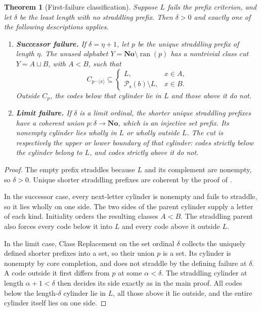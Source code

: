 \documentclass[11pt]{article}
\newtheorem{theorem}{Theorem}[section]
\theoremstyle{definition}
\theoremstyle{remark}
\newcommand{\No}{\mathbf{No}}
\newcommand{\Psupp}{\mathcal P_{\mathrm{s}}}
\begin{document}
\begin{theorem}[First-failure classification]
\label{swo:sh:thm:cut-first-failure}
Suppose $L$ fails the prefix criterion, and let $\delta$ be the
least length with no straddling prefix.  Then $\delta>0$ and
exactly one of the following descriptions applies.
\begin{enumerate}
\item \textbf{Successor failure.} If $\delta=\eta+1$, let $p$ be
the unique straddling prefix of length $\eta$.  The unused alphabet
$Y=\No\setminus\operatorname{ran}(p)$ has a nontrivial
class cut $Y=A\sqcup B$, with $A<B$, such that
\[
 C_{p\mathbin{{}^\frown}\langle x\rangle}
 \subseteq
 \begin{cases}
 L,&x\in A,\\
 \Psupp(b)\setminus L,&x\in B.
 \end{cases}
\]
Outside $C_{p}$, the codes below that cylinder lie in
$L$ and those above it do not.
\item \textbf{Limit failure.} If $\delta$ is a limit ordinal,
the shorter unique straddling prefixes have a coherent union
$p:\delta\to\No$, which is an injective \emph{set}
prefix.  Its nonempty cylinder lies wholly in $L$ or wholly outside
$L$.  The cut is respectively the upper or lower boundary of
that cylinder: codes strictly below the cylinder belong to $L$,
and codes strictly above it do not.
\end{enumerate}
\end{theorem}
\begin{proof}
The empty prefix straddles because $L$ and its complement are
nonempty, so $\delta>0$.  Unique shorter straddling prefixes are
coherent by the proof of .

In the successor case, every next-letter cylinder is nonempty
and fails to straddle, so it lies wholly on one side.  The two
sides of the parent cylinder supply a letter of each kind.
Initiality orders the resulting classes $A<B$.  The straddling
parent also forces every code below it into $L$ and every code
above it outside $L$.

In the limit case, Class Replacement on the set ordinal $\delta$
collects the uniquely defined shorter prefixes into a set, so their
union $p$ is a set.  Its cylinder is nonempty by core completion,
and does not straddle by the defining failure at $\delta$.
A code outside it first differs from $p$ at some $\alpha<\delta$.
The straddling cylinder at length $\alpha+1<\delta$ then decides
its side exactly as in the main proof.  All codes below the
length-$\delta$ cylinder lie in $L$, all those above it lie
outside, and the entire cylinder itself lies on one side.
\end{proof}
\end{document}
